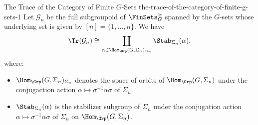 \begin{example}{The Trace of the Category of Finite $G$-Sets \rmI}{the-trace-of-the-category-of-finite-g-sets-1}%
    Let $\mathcal{G}_{n}$ be the full subgroupoid of $\FinSets^{\simeq}_{G}$ spanned by the $G$-sets whose underlying set is given by $[n]=\{1,\ldots,n\}$. We have
    \[
        \Tr(\mathcal{G}_{n})%
        \cong%
        \coprod_{\alpha\in\Hom_{\Grp}(G,\Sigma_{n})_{\Sigma_{n}}}\Stab_{\Sigma_{n}}(\alpha),%
    \]%
    where:
    \begin{itemize}
        \item $\Hom_{\Grp}(G,\Sigma_{n})_{\Sigma_{n}}$ denotes the space of orbits of $\Hom_{\Grp}(G,\Sigma_{n})$ under the conjugaction action $\alpha\mapsto\sigma^{-1}\alpha\sigma$ of $\Sigma_{n}$.
        \item $\Stab_{\Sigma_{n}}(\alpha)$ is the stabilizer subgroup of $\Sigma_{n}$ under the conjugation action $\alpha\mapsto\sigma^{-1}\alpha\sigma$ of $\Sigma_{n}$ on $\Hom_{\Grp}(G,\Sigma_{n})$.
    \end{itemize}
\end{example}
